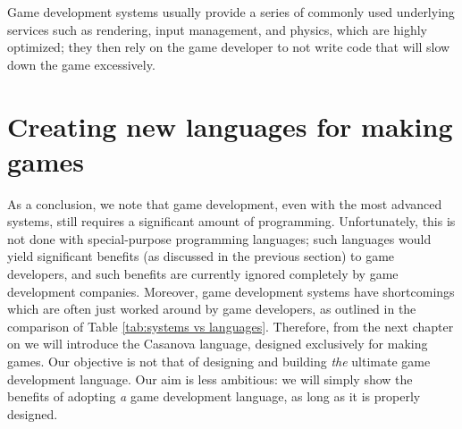 Game development systems usually provide a series of commonly used underlying services such as rendering, input management, and physics, which are highly optimized; they then rely on the game developer to not write code that will slow down the game excessively.


\section{Creating new languages for making games}
As a conclusion, we note that game development, even with the most advanced systems, still requires a significant amount of programming. Unfortunately, this is not done with special-purpose programming languages; such languages would yield significant benefits (as discussed in the previous section) to game developers, and such benefits are currently ignored completely by game development companies. Moreover, game development systems have shortcomings which are often just worked around by game developers, as outlined in the comparison of Table \ref{tab:systems vs languages}. Therefore, from the next chapter on we will introduce the Casanova language, designed exclusively for making games. Our objective is not that of designing and building \textit{the} ultimate game development language. Our aim is less ambitious: we will simply show the benefits of adopting \textit{a} game development language, as long as it is properly designed.

